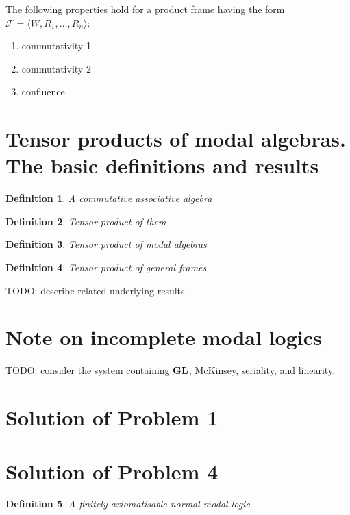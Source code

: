 \documentclass[a4paper]{article}
\theoremstyle{defin}
\newtheorem{defin}{Definition}
\theoremstyle{theorem}
\theoremstyle{prop}
\theoremstyle{lemma}
\theoremstyle{ex}
\theoremstyle{col}
\begin{document}
The following properties hold for a product frame having the form $\mathcal{F} = \langle W, R_1, \dots, R_n \rangle$:

\begin{enumerate}
  \item commutativity 1
  \item commutativity 2
  \item confluence
\end{enumerate}

\section{Tensor products of modal algebras. The basic definitions and results}

\begin{defin} A commutative associative algebra
\end{defin}

\begin{defin} Tensor product of them
\end{defin}

\begin{defin} Tensor product of modal algebras
\end{defin}

\begin{defin} Tensor product of general frames
\end{defin}

TODO: describe related underlying results

\section{Note on incomplete modal logics}

TODO: consider the system containing ${\bf GL}$, McKinsey, seriality, and linearity.

\section{Solution of Problem 1}

\section{Solution of Problem 4}

\begin{defin} A finitely axiomatisable normal modal logic
\end{defin}



\end{document}
